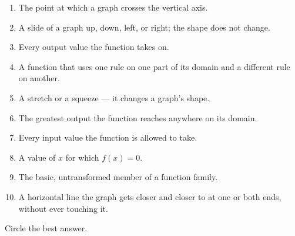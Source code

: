\vspace{6pt}
\begin{enumerate}[label=(\Alph*), leftmargin=2.4em, itemsep=1pt, topsep=2pt, font=\bfseries]
  \small
  \item The point at which a graph crosses the vertical axis.
  \item A slide of a graph up, down, left, or right; the shape does not change.
  \item Every output value the function takes on.
  \item A function that uses one rule on one part of its domain and a different rule on another.
  \item A stretch or a squeeze --- it changes a graph's shape.
  \item The greatest output the function reaches anywhere on its domain.
  \item Every input value the function is allowed to take.
  \item A value of $x$ for which $f(x)=0$.
  \item The basic, untransformed member of a function family.
  \item A horizontal line the graph gets closer and closer to at one or both ends, without ever
        touching it.
\end{enumerate}


\noindent\small Circle the best answer.

